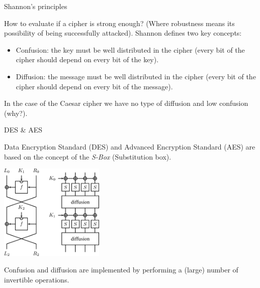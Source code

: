 \documentclass[handout, xcolor=dvipsnames,aspectratio=169]{beamer}
\begin{document}
\begin{frame}{Shannon's principles}

  \pause
  How to evaluate if a cipher is strong enough? (Where robustness means its possibility of being successfully attacked).
  \medskip
  \pause
  Shannon defines two key concepts:

  \begin{itemize}
    \item Confusion: the key must be well distributed in the cipher (every bit of the cipher should depend on every bit of the key).
    \item Diffusion: the message must be well distributed in the cipher (every bit of the cipher should depend on every bit of the message).
  \end{itemize}

  \medskip
  \pause

  In the case of the Caesar cipher we have no type of diffusion and low confusion (why?).

\end{frame}


\begin{frame}{DES \& AES}

  Data Encryption Standard (DES) and Advanced Encryption Standard (AES) are based on the concept of the \textit{S-Box} (Substitution box).

  \pause

  \medskip

  \centering\includegraphics[width=5cm]{img/des}

  \medskip

  Confusion and diffusion are implemented by performing a (large) number of invertible operations.

\end{frame}
\end{document}
